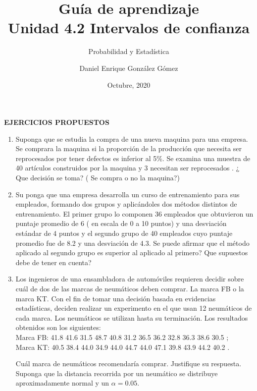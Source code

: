 \documentclass[base=hide,9pt]{elegantbook}
\title{Guía de  aprendizaje\\
	Unidad  4.2 Intervalos de confianza}
\subtitle{Probabilidad y Estadística}
\author{Daniel Enrique González Gómez}
\institute{Pontificia Universidad Javeriana Cali}
\date{Octubre, 2020}
\begin{document}
	
\textcolor{col4}{\bf \large EJERCICIOS PROPUESTOS} 
\vspace{1cm}
\begin{enumerate}
	\item Suponga que se estudia la compra de una nueva maquina para una empresa. Se comprara la maquina si la proporción de la producción que necesita ser reprocesados por tener   defectos es inferior al 5\%. Se examina una muestra de 40 artículos construidos  por la maquina y 3 necesitan ser reprocesados . ¿ Que decisión se toma? ( Se compra o no la maquina?)
	\vspace{.5cm}
	\item Su ponga que una empresa desarrolla un curso de entrenamiento para sus empleados, formando dos grupos y aplicándoles dos métodos distintos de entrenamiento. El primer grupo lo componen 36 empleados que obtuvieron un puntaje promedio de 6 ( en escala de 0 a 10 puntos) y una desviación estándar de 4 puntos y el segundo grupo de 40 empleados cuyo puntaje promedio fue de 8.2 y una desviación de 4.3. Se puede afirmar que el método aplicado al segundo grupo es superior al aplicado al primero? 
	Que supuestos debe de tener en cuenta?
	\vspace{.5cm}
	\item Los ingenieros de una ensambladora de automóviles requieren decidir sobre cuál de dos de las marcas de neumáticos deben comprar. La marca FB o la marca KT. Con el fin de tomar una decisión basada en evidencias estadísticas, deciden realizar un experimento en el que usan 12 neumáticos de cada marca. Los neumáticos se utilizan hasta su terminación. Los resultados obtenidos son los siguientes: \\
	
	Marca FB: 41.8 41.6 31.5 48.7 40.8 31.2 36.5 36.2 32.8 36.3 38.6 30.5 ;\\ 
	Marca KT: 40.5 38.4 44.0 34.9 44.0 44.7 44.0 47.1 39.8 43.9 44.2 40.2 .
	\vspace{.3cm}
	
	Cuál marca de neumáticos recomendaría comprar. Justifique su respuesta. Suponga que la distancia recorrida por un neumático se distribuye aproximadamente normal y un $\alpha=0.05$.
	\vspace{.5cm}
	

\end{enumerate}
\end{document}
